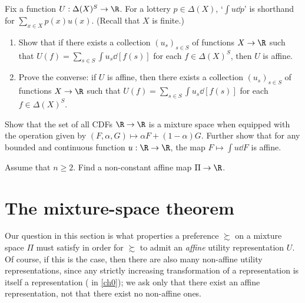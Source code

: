 \begin{namedthm}[\Cref*{exercise:mix_acts} {\normalfont (continued).}]
	\label{exercise:mix_acts_affine}
	Fix a function $U : \Delta(X)^S \to \R$. For a lottery $p \in \Delta(X)$, `$\int u \dd p$' is shorthand for $\sum_{x \in X} p(x) u(x)$. (Recall that $X$ is finite.)

	\begin{enumerate}[label=(\alph*)]
	
		\item Show that if there exists a collection $(u_s)_{s \in S}$ of functions $X \to \R$ such that $U(f) = \sum_{s \in S} \int u_s \dd[f(s)]$ for each $f \in \Delta(X)^S$, then $U$ is affine.

		\item Prove the converse: if $U$ is affine, then there exists a collection $(u_s)_{s \in S}$ of functions $X \to \R$ such that $U(f) = \sum_{s \in S} \int u_s \dd[f(s)]$ for each $f \in \Delta(X)^S$.
	
	\end{enumerate}
\end{namedthm}

\begin{exercise}
	\label{exercise:mix_lottconts}
	Show that the set of all CDFs $\R \to \R$ is a mixture space when equipped with the operation given by $(F,\alpha,G) \mapsto \alpha F + (1-\alpha) G$. Further show that for any bounded and continuous function $u : \R \to \R$, the map $F \mapsto \int u \dd F$ is affine.
\end{exercise}

\begin{namedthm}
	\label{exercise:mix_utility_affine}
	Assume that $n \geq 2$. Find a non-constant affine map $\Pi \to \R$.
\end{namedthm}



\section{The mixture-space theorem}
\label{mix:mix}

Our question in this section is what properties a preference $\succsim$ on a mixture space $\Pi$ must satisfy in order for $\succsim$ to admit an \emph{affine} utility representation $U$. Of course, if this is the case, then there are also many non-affine utility representations, since any strictly increasing transformation of a representation is itself a representation ( in \cref{ch0}); we ask only that there exist an affine representation, not that there exist no non-affine ones.

